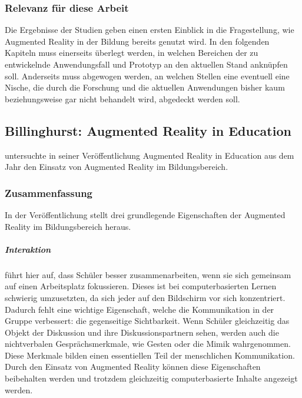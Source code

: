 \subsubsection{Relevanz für diese Arbeit}
Die Ergebnisse der Studien geben einen ersten Einblick in die Fragestellung, wie Augmented Reality in der Bildung bereits genutzt wird. In den folgenden Kapiteln muss einerseits überlegt werden, in welchen Bereichen der zu entwickelnde Anwendungsfall und Prototyp an den aktuellen Stand anknüpfen soll. Anderseits muss abgewogen werden, an welchen Stellen eine eventuell eine Nische, die durch die Forschung und die aktuellen Anwendungen bisher kaum beziehungsweise gar nicht behandelt wird, abgedeckt werden soll.


\subsection{Billinghurst: Augmented Reality in Education}\label{sec:billinghurst-ar-education}
\citeauthor{billinghurst:ar-in-education} untersuchte in seiner Veröffentlichung \glqq Augmented Reality in Education\grqq{} aus dem Jahr \citeyear{billinghurst:ar-in-education} den Einsatz von Augmented Reality im Bildungsbereich.

\subsubsection{Zusammenfassung}
In der Veröffentlichung stellt \citeauthor{billinghurst:ar-in-education} drei grundlegende Eigenschaften der Augmented Reality im Bildungsbereich heraus.

\subparagraph{Interaktion}
\citeauthor{billinghurst:ar-in-education} führt hier auf, dass Schüler besser zusammenarbeiten, wenn sie sich gemeinsam auf einen Arbeitsplatz fokussieren. Dieses ist bei computerbasierten Lernen schwierig umzusetzten, da sich jeder auf den Bildschirm vor sich konzentriert. Dadurch fehlt eine wichtige Eigenschaft, welche die Kommunikation in der Gruppe verbessert: die gegenseitige Sichtbarkeit. Wenn Schüler gleichzeitig das Objekt der Diskussion und ihre Diskussionspartnern sehen, werden auch die nichtverbalen Gesprächsmerkmale, wie Gesten oder die Mimik wahrgenommen. Diese Merkmale bilden einen essentiellen Teil der menschlichen Kommunikation. 
Durch den Einsatz von Augmented Reality können diese Eigenschaften beibehalten werden und trotzdem gleichzeitig computerbasierte Inhalte angezeigt werden. \citep[S. 2-3]{billinghurst:ar-in-education}

